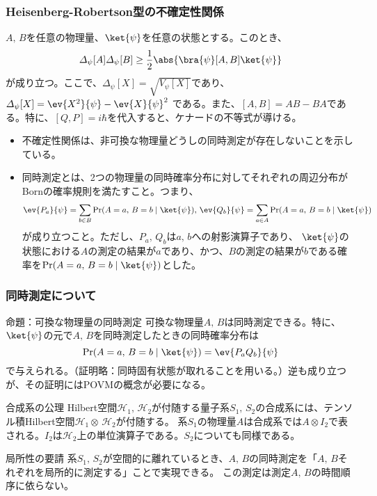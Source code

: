\documentclass[11pt,aspectratio=169,xcolor=dvipsnames,table,dvipdfmx]{beamer}
\begin{document}
\begin{frame}
  \frametitle{Heisenberg-Robertson型の不確定性関係}
$A,\,B$を任意の物理量、$\ket{\psi}$を任意の状態とする。このとき、
\begin{equation}
  \varDelta_{\psi}[A]\varDelta_{\psi}[B]\geq \frac{1}{2}\abs{\bra{\psi}[A,B]\ket{\psi}}
\end{equation}
が成り立つ。ここで、$\varDelta_{\psi}[X] = \sqrt{V_{\psi}[X]}$であり、
$\varDelta_{\psi}[X] = \ev{X^2}{\psi} - \ev{X}{\psi}^2$
である。また、$[A,B] = AB-BA$である。特に、$[Q,P]=i\hbar$を代入すると、ケナードの不等式が導ける。

\begin{itemize}
  \item 不確定性関係は、非可換な物理量どうしの同時測定が存在しないことを示している。
  \item 同時測定とは、2つの物理量の同時確率分布に対してそれぞれの周辺分布がBornの確率規則を満たすこと。つまり、
  \begin{equation}
    \ev{P_a}{\psi} = \sum_{b\in B}\Pr(A=a,\,B=b\mid\ket{\psi}),\, \ev{Q_b}{\psi} = \sum_{a\in A}\Pr(A=a,\,B=b\mid\ket{\psi})
  \end{equation}
  が成り立つこと。ただし、$P_a,\,Q_b$は$a,\,b$への射影演算子であり、
  $\ket{\psi}$の状態における$A$の測定の結果が$a$であり、かつ、$B$の測定の結果が$b$である確率を$\Pr(A=a,\,B=b\mid\ket{\psi})$とした。
\end{itemize}
\end{frame}

\begin{frame}
  \frametitle{同時測定について}
  \begin{block}{命題：可換な物理量の同時測定}
    可換な物理量$A,\,B$は同時測定できる。特に、$\ket{\psi}$の元で$A,\,B$を同時測定したときの同時確率分布は
  \begin{equation}
    \Pr(A=a,\,B=b\mid\ket{\psi}) = \ev{P_aQ_b}{\psi}
  \end{equation}
  で与えられる。（証明略：同時固有状態が取れることを用いる。）逆も成り立つが、その証明にはPOVMの概念が必要になる。
  \end{block}
  \begin{block}{合成系の公理}
    Hilbert空間$\mathcal{H}_1,\,\mathcal{H}_2$が付随する量子系$S_1,\,S_2$の合成系には、テンソル積Hilbert空間$\mathcal{H}_1\otimes\,\mathcal{H}_2$が付随する。
    系$S_1$の物理量$A$は合成系では$A\otimes I_2$で表される。$I_2$は$\mathcal{H}_2$上の単位演算子である。$S_2$についても同様である。
  \end{block}
  \begin{block}{局所性の要請}
    系$S_1,\,S_2$が空間的に離れているとき、$A,\,B$の同時測定を「$A,\,B$それぞれを局所的に測定する」ことで実現できる。
    この測定は測定$A,\,B$の時間順序に依らない。
  \end{block}
  

\end{frame}
\end{document}
